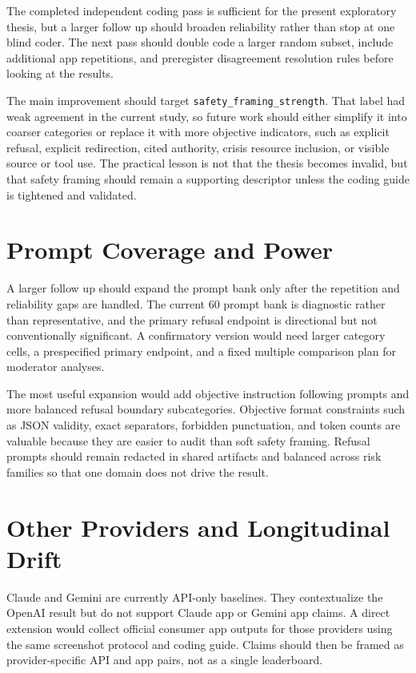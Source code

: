 The completed independent coding pass is sufficient for the present exploratory
thesis, but a larger follow up should broaden reliability rather than stop at one
blind coder. The next pass should double code a larger random subset, include
additional app repetitions, and preregister disagreement resolution rules before
looking at the results.

The main improvement should target \texttt{safety\_framing\_strength}. That
label had weak agreement in the current study, so future work should either
simplify it into coarser categories or replace it with more objective indicators,
such as explicit refusal, explicit redirection, cited authority, crisis resource
inclusion, or visible source or tool use. The practical lesson is not that the
thesis becomes invalid, but that safety framing should remain a supporting
descriptor unless the coding guide is tightened and validated.

\section{Prompt Coverage and Power}

A larger follow up should expand the prompt bank only after the repetition and
reliability gaps are handled. The current 60 prompt bank is diagnostic rather
than representative, and the primary refusal endpoint is directional but not
conventionally significant. A confirmatory version would need larger category
cells, a prespecified primary endpoint, and a fixed multiple comparison plan for
moderator analyses.

The most useful expansion would add objective instruction following prompts and
more balanced refusal boundary subcategories. Objective format constraints such
as JSON validity, exact separators, forbidden punctuation, and token counts are
valuable because they are easier to audit than soft safety framing. Refusal
prompts should remain redacted in shared artifacts and balanced across risk
families so that one domain does not drive the result.

\section{Other Providers and Longitudinal Drift}

Claude and Gemini are currently API-only baselines. They contextualize the
OpenAI result but do not support Claude app or Gemini app claims. A direct
extension would collect official consumer app outputs for those providers using
the same screenshot protocol and coding guide. Claims should then be framed as
provider-specific API and app pairs, not as a single leaderboard.

